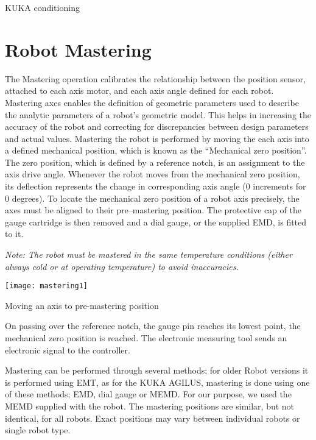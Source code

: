 \documentclass{book}
\begin{document}
	\begin{chapter}{KUKA conditioning} 
	\section{Robot Mastering}
	
	The Mastering operation calibrates the relationship between the position sensor, attached to each axis motor, and each axis angle defined for each robot. Mastering axes enables the definition of geometric parameters used to describe the analytic parameters of a robot’s geometric model. This helps in increasing the accuracy of the robot and correcting for discrepancies between design parameters and actual values.
	\newline
	Mastering the robot is performed by moving the each axis into a defined mechanical position, which is known as the “Mechanical zero position”. The zero position, which is defined by a reference notch, is an assignment to the axis drive angle. Whenever the robot moves from the mechanical zero position, its deflection represents the change in corresponding axis angle (0 increments for 0 degrees).
	\newline
	To locate the mechanical zero position of a robot axis precisely, the axes must be aligned to their pre–mastering position. The protective cap of the gauge cartridge is then removed and a dial gauge, or the supplied EMD, is fitted to it. 
	
		\begin{center}\textit{Note: The robot must be mastered in the same temperature conditions (either always cold or at operating temperature) to avoid inaccuracies.}
			

		\texttt{[image: mastering1]}
		\caption{Moving an axis to pre-mastering position}
	\end{center}

	
	On passing over the reference notch, the gauge pin reaches its lowest point, the mechanical zero position is reached. The electronic measuring tool sends an electronic signal to the controller.
	
	Mastering can be performed through several methods; for older Robot versions it is performed using EMT, as for the KUKA AGILUS, mastering is done using one of these methods; EMD, dial gauge or MEMD. For our purpose, we used the MEMD supplied with the robot. The mastering positions are similar, but not identical, for all robots. Exact positions may vary between individual robots or single robot type. 
	

\end{chapter}
\end{document}
